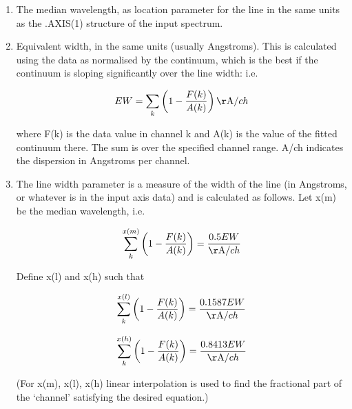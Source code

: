 \begin{enumerate}
\item
   The median wavelength, as location parameter for the line in the
   same units as the .AXIS(1) structure of the input spectrum.

\item
   Equivalent width, in the same units (usually Angstroms). This is
   calculated using the data as normalised by the continuum, which is
   the best if the continuum is sloping significantly over the line
   width: i.e.

\begin{displaymath}
   EW = \sum_k \left( 1 - {F(k)\over A(k)} \right) {{\rm \AA}/ch}
\end{displaymath}

   where F(k) is the data value in channel k and A(k) is the value
   of the fitted continuum there. The sum is over the specified channel
   range. A/ch indicates the dispersion in Angstroms per
   channel.

\item
   The line width parameter is a measure of the width of the line (in
   Angstroms, or whatever is in the input axis data) and is calculated
   as follows. Let x(m) be the median wavelength, i.e.

\begin{displaymath}
   \sum_k^{x(m)} \left( 1 - {F(k)\over A(k)} \right)
      = {0.5 EW \over {\rm \AA}/ch}
\end{displaymath}

   Define x(l) and x(h) such that

\begin{displaymath}
   \sum_k^{x(l)} \left( 1 - {F(k)\over A(k)} \right)
      = {0.1587 EW \over {\rm \AA}/ch}
\end{displaymath}

\begin{displaymath}
   \sum_k^{x(h)} \left( 1 - {F(k)\over A(k)} \right)
      = {0.8413 EW \over {\rm \AA}/ch}
\end{displaymath}


   (For x(m), x(l), x(h) linear interpolation is used to find the
   fractional part of the `channel' satisfying the desired equation.)


\end{enumerate}
